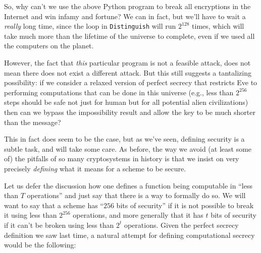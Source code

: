 So, why can't we use the above Python program to break all encryptions
in the Internet and win infamy and fortune? We can in fact, but we'll
have to wait a \emph{really} long time, since the loop in
\texttt{Distinguish} will run \(2^{128}\) times, which will take much
more than the lifetime of the universe to complete, even if we used all
the computers on the planet.

However, the fact that \emph{this} particular program is not a feasible
attack, does not mean there does not exist a different attack. But this
still suggests a tantalizing possibility: if we consider a relaxed
version of perfect secrecy that restricts Eve to performing computations
that can be done in this universe (e.g., less than \(2^{256}\) steps
should be safe not just for human but for all potential alien
civilizations) then can we bypass the impossibility result and allow the
key to be much shorter than the message?

This in fact does seem to be the case, but as we've seen, defining
security is a subtle task, and will take some care. As before, the way
we avoid (at least some of) the pitfalls of so many cryptosystems in
history is that we insist on very precisely \emph{defining} what it
means for a scheme to be secure.

Let us defer the discussion how one defines a function being computable
in ``less than \(T\) operations'' and just say that there is a way to
formally do so. We will want to say that a scheme has ``\(256\) bits of
security'' if it is not possible to break it using less than \(2^{256}\)
operations, and more generally that it has \(t\) bits of security if it
can't be broken using less than \(2^t\) operations. Given the perfect
secrecy definition we saw last time, a natural attempt for defining
computational secrecy would be the following:

\hypertarget{firstcompdef}{}

